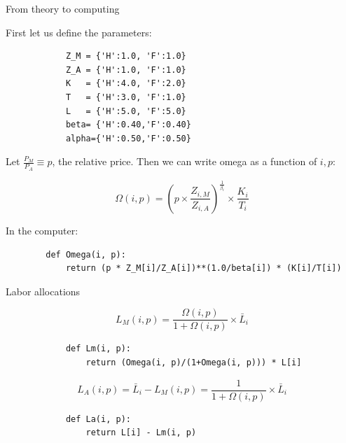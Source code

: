 \documentclass[notes,11pt, aspectratio=169, xcolor=table]{beamer}
\newenvironment{wideitemize}{\itemize\addtolength{\itemsep}{10pt}}{\enditemize}
\begin{document}
\begin{frame}[fragile=singleslide]{From theory to computing}

\begin{wideitemize}
    \item First let us define the parameters:

        \begin{verbatim}
            Z_M = {'H':1.0, 'F':1.0} 
            Z_A = {'H':1.0, 'F':1.0} 
            K   = {'H':4.0, 'F':2.0} 
            T   = {'H':3.0, 'F':1.0} 
            L   = {'H':5.0, 'F':5.0}
            beta= {'H':0.40,'F':0.40}
            alpha={'H':0.50,'F':0.50}
        \end{verbatim}    

    
    \item Let $\frac{P_{M}}{P_{A}}\equiv p$, the relative price. Then we can write omega as a function of $i,p$:

    \begin{equation*}
        \Omega(i,p) = \left( p \times\frac{Z_{i,M}}{Z_{i,A}} \right)^{\frac{1}{\beta_i}} \times  \frac{K_{i}}{T_{i}}
    \end{equation*}

    \item In the computer:

        \begin{verbatim}
        def Omega(i, p):
            return (p * Z_M[i]/Z_A[i])**(1.0/beta[i]) * (K[i]/T[i])
        \end{verbatim}    

\end{wideitemize}
    
\end{frame}


\begin{frame}[fragile=singleslide]{Labor allocations}

        \begin{equation*}
         L_{M}(i,p) = \frac{\Omega(i,p)}{1+\Omega(i,p)} \times \bar{L}_i
         \end{equation*}

        \begin{verbatim}
            def Lm(i, p):
                return (Omega(i, p)/(1+Omega(i, p))) * L[i]
        \end{verbatim}    

        \begin{equation*}
           L_{A}(i,p) = \bar{L}_i - L_{M}(i,p) =  \frac{1}{1+\Omega(i,p)}  \times  \bar{L}_i
        \end{equation*}

        \begin{verbatim}
            def La(i, p):
                return L[i] - Lm(i, p)
        \end{verbatim}    


\end{frame}
\end{document}
